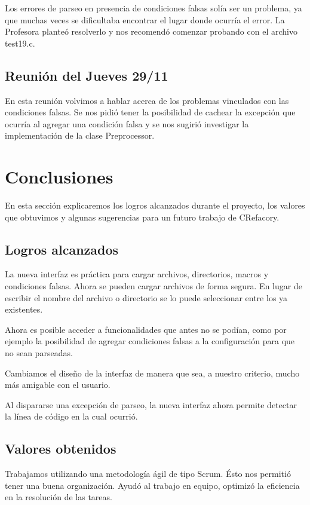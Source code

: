 \documentclass[a4paper,oneside,12pt]{article}
\begin{document}
Los errores de parseo en presencia de condiciones falsas sol\'ia ser un problema, ya que muchas veces se dificultaba encontrar el lugar donde ocurr\'ia el error. La Profesora plante\'o resolverlo y nos recomend\'o comenzar probando con el archivo test19.c.

\subsection{Reuni\'on del Jueves 29/11}
En esta reuni\'on volvimos a hablar acerca de los problemas vinculados con las condiciones falsas. Se nos pidi\'o tener la posibilidad de cachear la excepci\'on que ocurr\'ia al agregar una condici\'on falsa y se nos sugiri\'o investigar la implementaci\'on de la clase Preprocessor.

\section{Conclusiones}
En esta secci\'on explicaremos los logros alcanzados durante el proyecto, los valores que obtuvimos y algunas sugerencias para un futuro trabajo de CRefacory.

\subsection{Logros alcanzados}
La nueva interfaz es pr\'actica para cargar archivos, directorios, macros y condiciones falsas. Ahora se pueden cargar archivos de forma segura. En lugar de escribir el nombre del archivo o directorio se lo puede seleccionar entre los ya existentes. 

Ahora es posible acceder a funcionalidades que antes no se pod\'ian, como por ejemplo la posibilidad de agregar condiciones falsas a la configuraci\'on para que no sean parseadas.

Cambiamos el diseño de la interfaz de manera que sea, a nuestro criterio, mucho m\'as amigable con el usuario.

Al dispararse una excepci\'on de parseo, la nueva interfaz ahora permite detectar la l\'inea de c\'odigo en la cual ocurri\'o.

\subsection{Valores obtenidos}
Trabajamos utilizando una metodolog\'ia \'agil de tipo Scrum. \'Esto nos permiti\'o tener una buena organizaci\'on. Ayud\'o al trabajo en equipo, optimiz\'o la eficiencia en la resoluci\'on de las tareas.
\end{document}
